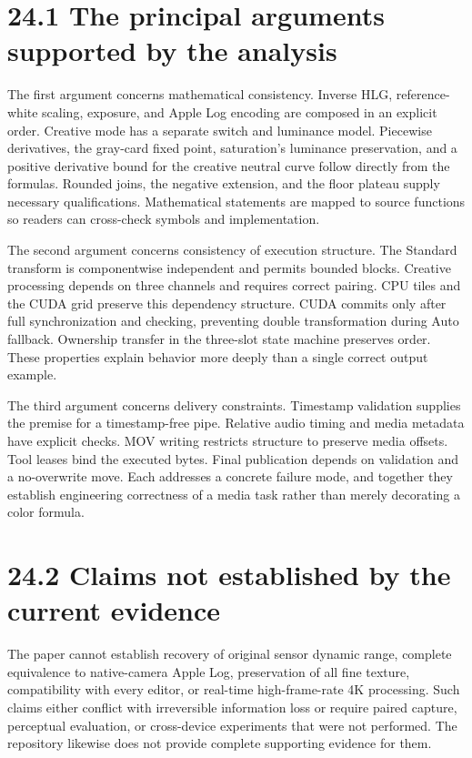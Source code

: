 \documentclass[11pt,a4paper,openany]{book}
\begin{document}
\section*{24.1 The principal arguments supported by the analysis}
The first argument concerns mathematical consistency. Inverse HLG, reference-white scaling, exposure, and Apple Log encoding are composed in an explicit order. Creative mode has a separate switch and luminance model. Piecewise derivatives, the gray-card fixed point, saturation's luminance preservation, and a positive derivative bound for the creative neutral curve follow directly from the formulas. Rounded joins, the negative extension, and the floor plateau supply necessary qualifications. Mathematical statements are mapped to source functions so readers can cross-check symbols and implementation.

The second argument concerns consistency of execution structure. The Standard transform is componentwise independent and permits bounded blocks. Creative processing depends on three channels and requires correct pairing. CPU tiles and the CUDA grid preserve this dependency structure. CUDA commits only after full synchronization and checking, preventing double transformation during Auto fallback. Ownership transfer in the three-slot state machine preserves order. These properties explain behavior more deeply than a single correct output example.

The third argument concerns delivery constraints. Timestamp validation supplies the premise for a timestamp-free pipe. Relative audio timing and media metadata have explicit checks. MOV writing restricts structure to preserve media offsets. Tool leases bind the executed bytes. Final publication depends on validation and a no-overwrite move. Each addresses a concrete failure mode, and together they establish engineering correctness of a media task rather than merely decorating a color formula.


\section*{24.2 Claims not established by the current evidence}
The paper cannot establish recovery of original sensor dynamic range, complete equivalence to native-camera Apple Log, preservation of all fine texture, compatibility with every editor, or real-time high-frame-rate 4K processing. Such claims either conflict with irreversible information loss or require paired capture, perceptual evaluation, or cross-device experiments that were not performed. The repository likewise does not provide complete supporting evidence for them.
\end{document}
